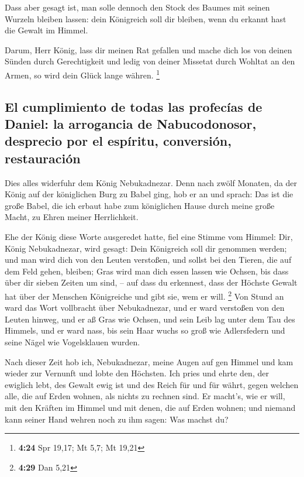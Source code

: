  Dass aber gesagt ist, man solle dennoch den Stock des
Baumes mit seinen Wurzeln bleiben lassen: dein Königreich soll dir
bleiben, wenn du erkannt hast die Gewalt im Himmel.

 Darum, Herr König, lass dir meinen Rat gefallen und
mache dich los von deinen Sünden durch Gerechtigkeit und ledig von
deiner Missetat durch Wohltat an den Armen, so wird dein Glück lange
währen. \footnote{\textbf{4:24} Spr 19,17; Mt 5,7; Mt 19,21}

\hypertarget{el-cumplimiento-de-todas-las-profecuxedas-de-daniel-la-arrogancia-de-nabucodonosor-desprecio-por-el-espuxedritu-conversiuxf3n-restauraciuxf3n}{%
\subsection{El cumplimiento de todas las profecías de Daniel: la
arrogancia de Nabucodonosor, desprecio por el espíritu, conversión,
restauración}\label{el-cumplimiento-de-todas-las-profecuxedas-de-daniel-la-arrogancia-de-nabucodonosor-desprecio-por-el-espuxedritu-conversiuxf3n-restauraciuxf3n}}

 Dies alles widerfuhr dem König Nebukadnezar.
 Denn nach zwölf Monaten, da der König auf der
königlichen Burg zu Babel ging,  hob er an und sprach:
Das ist die große Babel, die ich erbaut habe zum königlichen Hause durch
meine große Macht, zu Ehren meiner Herrlichkeit.

 Ehe der König diese Worte ausgeredet hatte, fiel eine
Stimme vom Himmel: Dir, König Nebukadnezar, wird gesagt: Dein Königreich
soll dir genommen werden;  und man wird dich von den
Leuten verstoßen, und sollst bei den Tieren, die auf dem Feld gehen,
bleiben; Gras wird man dich essen lassen wie Ochsen, bis dass über dir
sieben Zeiten um sind, -- auf dass du erkennest, dass der Höchste Gewalt
hat über der Menschen Königreiche und gibt sie, wem er will. \footnote{\textbf{4:29}
  Dan 5,21}  Von Stund an ward das Wort vollbracht über
Nebukadnezar, und er ward verstoßen von den Leuten hinweg, und er aß
Gras wie Ochsen, und sein Leib lag unter dem Tau des Himmels, und er
ward nass, bis sein Haar wuchs so groß wie Adlersfedern und seine Nägel
wie Vogelsklauen wurden.

 Nach dieser Zeit hob ich, Nebukadnezar, meine Augen auf
gen Himmel und kam wieder zur Vernunft und lobte den Höchsten. Ich pries
und ehrte den, der ewiglich lebt, des Gewalt ewig ist und des Reich für
und für währt,  gegen welchen alle, die auf Erden wohnen,
als nichts zu rechnen sind. Er macht's, wie er will, mit den Kräften im
Himmel und mit denen, die auf Erden wohnen; und niemand kann seiner Hand
wehren noch zu ihm sagen: Was machst du?

